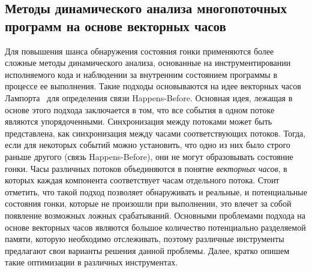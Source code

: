 \subsection{Методы динамического анализа многопоточных программ на основе векторных часов}

Для повышения шанса обнаружения состояния гонки применяются более сложные методы динамического анализа, основанные на инструментировании исполняемого кода и наблюдении за внутренним состоянием программы в процессе ее выполнения.
Такие подходы основываются на идее векторных часов Лампорта~\cite{Lamport} для определения связи Happens-Before.
Основная идея, лежащая в основе этого подхода заключается в том, что все события в одном потоке являются упорядоченными.
Синхронизация между потоками может быть представлена, как синхронизация между часами соответствующих потоков. 
Тогда, если для некоторых событий можно установить, что одно из них было строго раньше другого (связь Happens-Before), они не могут образовывать состояние гонки.
Часы различных потоков объединяются в понятие \textit{векторных часов}, в которых каждая компонента соответствует часам отдельного потока.
Стоит отметить, что такой подход позволяет обнаруживать и реальные, и потенциальные состояния гонки, которые не произошли при выполнении, это влечет за собой появление возможных ложных срабатываний.
Основными проблемами подхода на основе векторных часов являются большое количество потенциально разделяемой памяти, которую необходимо отслеживать, поэтому различные инструменты предлагают свои варианты решения данной проблемы.
Далее, кратко опишем такие оптимизации в различных инструментах.




